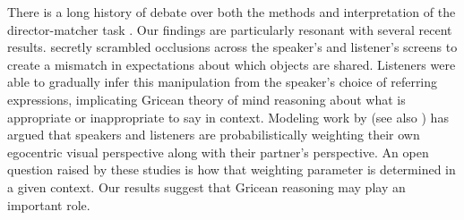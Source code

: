 \documentclass[manuscript]{stjour}
\begin{document}

There is a long history of debate over both the methods and interpretation of the director-matcher task \cite[e.g.]{HannaTanenhausTrueswell03_CommonGroundPerspective, HannaTanenhaus04_PragmaticEffects, HellerGrodnerTanenhaus08_Perspective, BrownSchmidtTanenhaus08_TargetedGame}. Our findings are particularly resonant with several recent results. \cite{RubioFernandez16_DirectorTaskAttention} secretly scrambled occlusions across the speaker's and listener's screens to create a mismatch in expectations about which objects are shared. Listeners were able to gradually infer this manipulation from the speaker's choice of referring expressions, implicating Gricean theory of mind reasoning about what is appropriate or inappropriate to say in context. Modeling work by \cite{HellerParisienStevenson16_ProbabilisticWeighing} (see also \cite{MozuraitisEtAl18_ProductionCombination}) has argued that speakers and listeners are probabilistically weighting their own egocentric visual perspective along with their partner's perspective. An open question raised by these studies is how that weighting parameter is determined in a given context. Our results suggest that Gricean reasoning may play an important role. 

\end{document}
